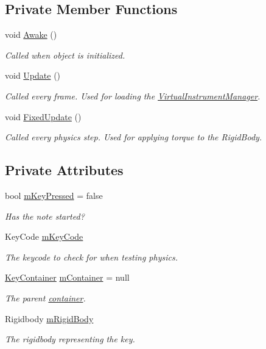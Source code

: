\subsection*{Private Member Functions}
\begin{DoxyCompactItemize}
\item 
void \hyperlink{group___white_key_unity_ga92c78e57e0ccc8cf2dec655676698b21}{Awake} ()
\begin{DoxyCompactList}\small\item\em Called when object is initialized. \end{DoxyCompactList}\item 
void \hyperlink{group___white_key_unity_ga160cb397de3ab7084247e7fede943cf7}{Update} ()
\begin{DoxyCompactList}\small\item\em Called every frame. Used for loading the \hyperlink{class_virtual_instrument_manager}{Virtual\+Instrument\+Manager}. \end{DoxyCompactList}\item 
void \hyperlink{group___white_key_unity_ga54ddd22238f4a46b2824eacb90430245}{Fixed\+Update} ()
\begin{DoxyCompactList}\small\item\em Called every physics step. Used for applying torque to the Rigid\+Body. \end{DoxyCompactList}\end{DoxyCompactItemize}
\subsection*{Private Attributes}
\begin{DoxyCompactItemize}
\item 
bool \hyperlink{group___white_key_priv_var_gae2501ace0af5e1313147504bf61bf3e9}{m\+Key\+Pressed} = false
\begin{DoxyCompactList}\small\item\em Has the note started? \end{DoxyCompactList}\item 
Key\+Code \hyperlink{group___white_key_priv_var_gaeb8c5eafd138c45894858554f739eaf7}{m\+Key\+Code}
\begin{DoxyCompactList}\small\item\em The keycode to check for when testing physics. \end{DoxyCompactList}\item 
\hyperlink{class_key_container}{Key\+Container} \hyperlink{group___white_key_priv_var_ga033fb0a319b61b61265201046c23e949}{m\+Container} = null
\begin{DoxyCompactList}\small\item\em The parent \hyperlink{group___doc_key_contain}{container}. \end{DoxyCompactList}\item 
Rigidbody \hyperlink{group___white_key_priv_var_gadc6bd637ef5229f7519b213f038ca15d}{m\+Rigid\+Body}
\begin{DoxyCompactList}\small\item\em The rigidbody representing the key. \end{DoxyCompactList}\end{DoxyCompactItemize}


